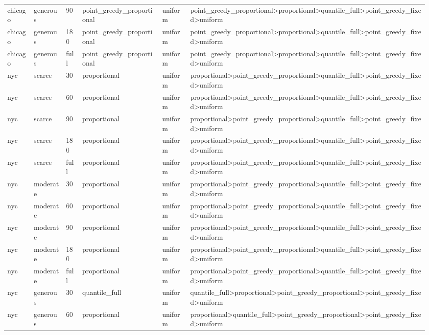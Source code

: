 \begin{tabular}{llllll}
chicago & generous & 90 & point\_greedy\_proportional & uniform & point\_greedy\_proportional>proportional>quantile\_full>point\_greedy\_fixed>uniform \\
chicago & generous & 180 & point\_greedy\_proportional & uniform & point\_greedy\_proportional>proportional>quantile\_full>point\_greedy\_fixed>uniform \\
chicago & generous & full & point\_greedy\_proportional & uniform & point\_greedy\_proportional>proportional>quantile\_full>point\_greedy\_fixed>uniform \\
nyc & scarce & 30 & proportional & uniform & proportional>point\_greedy\_proportional>quantile\_full>point\_greedy\_fixed>uniform \\
nyc & scarce & 60 & proportional & uniform & proportional>point\_greedy\_proportional>quantile\_full>point\_greedy\_fixed>uniform \\
nyc & scarce & 90 & proportional & uniform & proportional>point\_greedy\_proportional>quantile\_full>point\_greedy\_fixed>uniform \\
nyc & scarce & 180 & proportional & uniform & proportional>point\_greedy\_proportional>quantile\_full>point\_greedy\_fixed>uniform \\
nyc & scarce & full & proportional & uniform & proportional>point\_greedy\_proportional>quantile\_full>point\_greedy\_fixed>uniform \\
nyc & moderate & 30 & proportional & uniform & proportional>point\_greedy\_proportional>quantile\_full>point\_greedy\_fixed>uniform \\
nyc & moderate & 60 & proportional & uniform & proportional>point\_greedy\_proportional>quantile\_full>point\_greedy\_fixed>uniform \\
nyc & moderate & 90 & proportional & uniform & proportional>point\_greedy\_proportional>quantile\_full>point\_greedy\_fixed>uniform \\
nyc & moderate & 180 & proportional & uniform & proportional>point\_greedy\_proportional>quantile\_full>point\_greedy\_fixed>uniform \\
nyc & moderate & full & proportional & uniform & proportional>point\_greedy\_proportional>quantile\_full>point\_greedy\_fixed>uniform \\
nyc & generous & 30 & quantile\_full & uniform & quantile\_full>proportional>point\_greedy\_proportional>point\_greedy\_fixed>uniform \\
nyc & generous & 60 & proportional & uniform & proportional>quantile\_full>point\_greedy\_proportional>point\_greedy\_fixed>uniform \\

\end{tabular}
